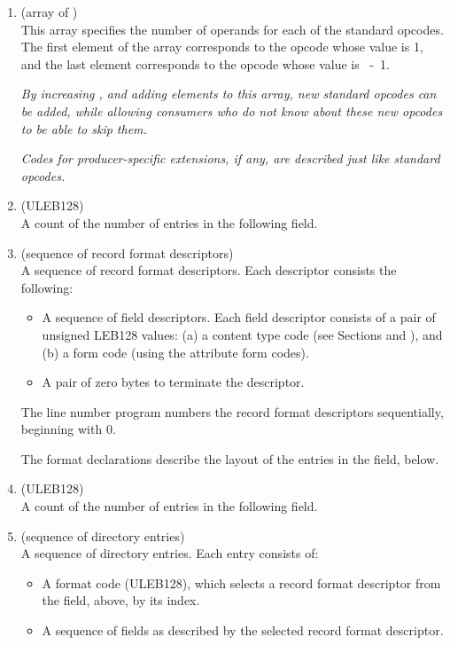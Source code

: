 \begin{enumerate}[1. ]
\item \HFNstandardopcodelengths{} (array of \HFTubyte) \\
This array specifies the number of  operands for each
of the standard opcodes. The first element of the array
corresponds to the opcode whose value is 1, and the last
element corresponds to the opcode whose value 
is \mbox{\HFNopcodebase{} - 1}.

\textit{By increasing \HFNopcodebase{}, and adding elements to this array,
new standard opcodes can be added, while allowing consumers who
do not know about these new opcodes to be able to skip them.}

\textit{Codes for 
\bb
producer-specific 
\eb
extensions, if any, are described
just like standard opcodes.}

\bb
\item \HFNdirectoryformatcount{} (ULEB128) \\
A count of the number of entries in the
following \HFNdirectoryformattable{} field.
\eb

\bb
\item \HFNdirectoryformattable{} (sequence of record format descriptors) \\
A sequence of record format descriptors.
Each descriptor consists the following:
\begin{itemize}
\setlength{\itemsep}{0em}
\item A sequence of field descriptors. Each field descriptor consists
of a pair of unsigned LEB128 values: (a) a content type code (see 
Sections  and
), and 
(b) a form code (using the attribute form codes).
\item A pair of zero bytes to terminate the descriptor.
\end{itemize}

The line number program numbers the record format descriptors
sequentially, beginning with 0.

The format declarations describe the layout of the entries
in the \HFNdirectories{} field, below.
\eb

\item \HFNdirectoriescount{} (ULEB128) \\
A count of the number of entries 
\db
in the following \HFNdirectories{} field.

\bb    
\item \HFNdirectories{} (sequence of directory entries) \\
A sequence of directory entries. Each entry consists of:
\begin{itemize}
\setlength{\itemsep}{0em}
\item A format code (ULEB128), which selects a record format 
descriptor from the \HFNdirectoryformattable{} field, above, 
by its index.
\item A sequence of fields as described by the selected record 
format descriptor.
\end{itemize}


\end{enumerate}
